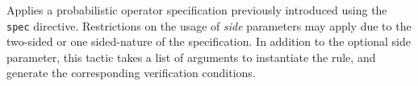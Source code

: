 \documentclass[a4paper,notitlepage]{book}
\begin{document}
  Applies a probabilistic operator specification previously introduced
  using the \verb|spec| directive. Restrictions on the usage of
  \emph{side} parameters may apply due to the two-sided or one
  sided-nature of the specification. In addition to the optional side
  parameter, this tactic takes a list of arguments to instantiate the
  rule, and generate the corresponding verification conditions.
  
\fi

\end{document}
